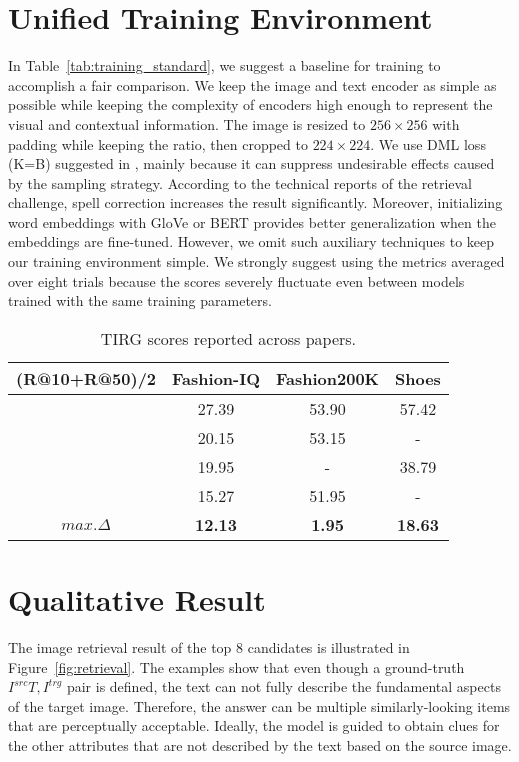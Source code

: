 \documentclass[10pt,twocolumn,letterpaper]{article}
\begin{document}
\section{Unified Training Environment}
In Table~\ref{tab:training_standard}, we suggest a baseline for training to accomplish a fair comparison. We keep the image and text encoder as simple as possible while keeping the complexity of encoders high enough to represent the visual and contextual information. The image is resized to $256 \times 256$ with padding while keeping the ratio, then cropped to $224 \times 224$. We use DML loss (K=B) suggested in \cite{vo2019composing}, mainly because it can suppress undesirable effects caused by the sampling strategy. According to the technical reports of the retrieval challenge, spell correction increases the result significantly.
Moreover, initializing word embeddings with GloVe or BERT provides better generalization when the embeddings are fine-tuned. However, we omit such auxiliary techniques to keep our training environment simple. We strongly suggest using the metrics averaged over eight trials because the scores severely fluctuate even between models trained with the same training parameters.

\begin{table}[H]
    \caption{TIRG scores reported across papers.}
    \centering
    \begin{adjustbox}{width=0.45\textwidth}
    \begin{tabular}{cccc}
    \toprule
    (R@10+R@50)/2 & Fashion-IQ & Fashion200K & Shoes \\ \hline \hline
    ~\cite{chen2020image}           & 27.39 & 53.90 & 57.42 \\
    ~\cite{anwaar2020compositional} & 20.15 & 53.15 & - \\
    ~\cite{jandial2020trace}        & 19.95 & - & 38.79 \\
    ~\cite{chen2020learning}        & 15.27 & 51.95 & - \\ \hline
    $\textit{max.}\Delta$           & \textbf{12.13} & \textbf{1.95} & \textbf{18.63} \\
    \bottomrule
    \end{tabular}
    \end{adjustbox}
    \label{tab:inconsistency}
\end{table}

\section{Qualitative Result}
The image retrieval result of the top 8 candidates is illustrated in Figure~\ref{fig:retrieval}. The examples show that even though a ground-truth $I^{src} T, I^{trg}$ pair is defined, the text can not fully describe the fundamental aspects of the target image. Therefore, the answer can be multiple similarly-looking items that are perceptually acceptable. Ideally, the model is guided to obtain clues for the other attributes that are not described by the text based on the source image.
\end{document}
